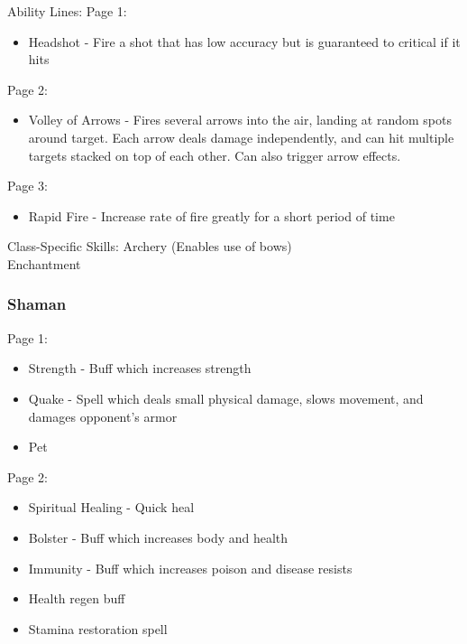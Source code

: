 \documentclass{article}
\begin{document}
Ability Lines:
Page 1:
\begin{itemize}
    \item Headshot - Fire a shot that has low accuracy but is guaranteed to critical if it hits
    
\end{itemize}

Page 2:
\begin{itemize}
    \item Volley of Arrows - Fires several arrows into the air, landing at random spots around target.
        Each arrow deals damage independently, and can hit multiple targets stacked on top of each
        other. Can also trigger arrow effects.
    
\end{itemize}

Page 3:
\begin{itemize}
    \item Rapid Fire - Increase rate of fire greatly for a short period of time
    
\end{itemize}

Class-Specific Skills:
Archery (Enables use of bows)\\
Enchantment\\


\subsubsection{Shaman}
Page 1:
\begin{itemize}
    \item Strength - Buff which increases strength
    \item Quake - Spell which deals small physical damage, slows movement, and damages opponent's armor
    \item Pet
    
\end{itemize}

Page 2:
\begin{itemize}
    \item Spiritual Healing - Quick heal
    \item Bolster - Buff which increases body and health
    \item Immunity - Buff which increases poison and disease resists
    \item Health regen buff
    \item Stamina restoration spell
    
\end{itemize}
\end{document}
